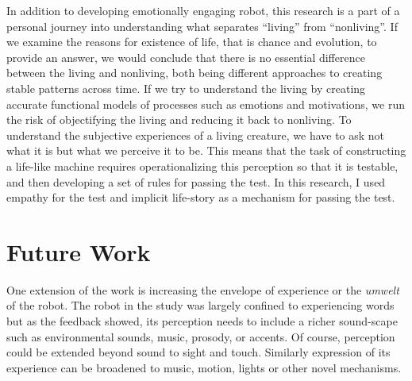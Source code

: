 In addition to developing emotionally engaging robot, this research is a part of a personal journey into understanding what separates ``living'' from ``nonliving''. If we examine the reasons for existence of life, that is chance and evolution, to provide an answer, we would conclude that there is no essential difference between the living and nonliving, both being different approaches to creating stable patterns across time\cite{dawkins_selfish_gene}. If we try to understand the living by creating accurate functional models of processes such as emotions and motivations, we run the risk of objectifying the living and reducing it back to nonliving. To understand the subjective experiences of a living creature, we have to ask not what it is but what we perceive it to be. This means that the task of constructing a life-like machine requires operationalizing this perception so that it is testable, and then developing a set of rules for passing the test. In this research, I used empathy for the test and implicit life-story as a mechanism for passing the test.



\section{Future Work}






One extension of the work is increasing the envelope of experience or the \emph{umwelt} of the robot. The robot in the study was largely confined to experiencing words but as the feedback showed, its perception needs to include a richer sound-scape such as environmental sounds, music, prosody, or accents. Of course, perception could be extended beyond sound to sight and touch. Similarly expression of its experience can be broadened to music, motion, lights or other novel mechanisms.

